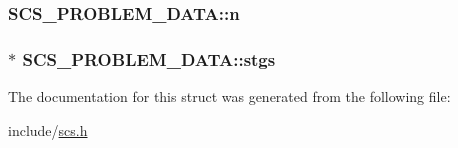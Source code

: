\hypertarget{struct_s_c_s___p_r_o_b_l_e_m___d_a_t_a_a390ecc6e49d9983503a57fac9f7fb4d5}{
\subsubsection[{n}]{ S\-C\-S\-\_\-\-P\-R\-O\-B\-L\-E\-M\-\_\-\-D\-A\-T\-A\-::n}}\label{struct_s_c_s___p_r_o_b_l_e_m___d_a_t_a_a390ecc6e49d9983503a57fac9f7fb4d5}
\hypertarget{struct_s_c_s___p_r_o_b_l_e_m___d_a_t_a_a14bfc0a349fe9be30059e55c4ba0066f}{
\subsubsection[{stgs}]{$\ast$ S\-C\-S\-\_\-\-P\-R\-O\-B\-L\-E\-M\-\_\-\-D\-A\-T\-A\-::stgs}}\label{struct_s_c_s___p_r_o_b_l_e_m___d_a_t_a_a14bfc0a349fe9be30059e55c4ba0066f}


The documentation for this struct was generated from the following file\-:\begin{DoxyCompactItemize}
\item 
include/\hyperlink{scs_8h}{scs.\-h}\end{DoxyCompactItemize}
